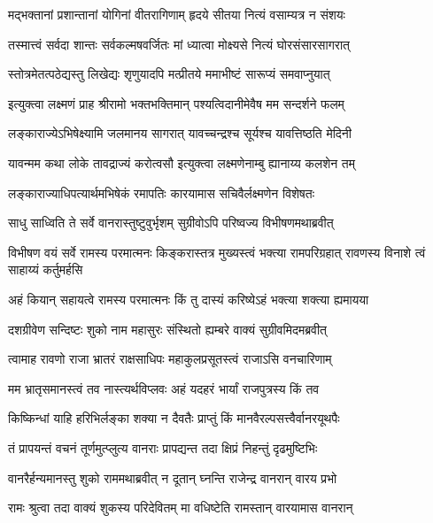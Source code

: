 \twolineshloka
{मद्भक्तानां प्रशान्तानां योगिनां वीतरागिणाम्}
{हृदये सीतया नित्यं वसाम्यत्र न संशयः} %

\twolineshloka
{तस्मात्त्वं सर्वदा शान्तः सर्वकल्मषवर्जितः}
{मां ध्यात्वा मोक्ष्यसे नित्यं घोरसंसारसागरात्} %

\twolineshloka
{स्तोत्रमेतत्पठेद्यस्तु लिखेद्यः शृणुयादपि}
{मत्प्रीतये ममाभीष्टं सारूप्यं समवाप्नुयात्} %

\twolineshloka
{इत्युक्त्वा लक्ष्मणं प्राह श्रीरामो भक्तभक्तिमान्}
{पश्यत्विदानीमेवैष मम सन्दर्शने फलम्} %

\twolineshloka
{लङ्काराज्येऽभिषेक्ष्यामि जलमानय सागरात्}
{यावच्चन्द्रश्च सूर्यश्च यावत्तिष्ठति मेदिनी} %

\twolineshloka
{यावन्मम कथा लोके तावद्राज्यं करोत्वसौ}
{इत्युक्त्वा लक्ष्मणेनाम्बु ह्यानाय्य कलशेन तम्} %

\twolineshloka
{लङ्काराज्याधिपत्यार्थमभिषेकं रमापतिः}
{कारयामास सचिवैर्लक्ष्मणेन विशेषतः} %

\twolineshloka
{साधु साध्विति ते सर्वे वानरास्तुष्टुवुर्भृशम्}
{सुग्रीवोऽपि परिष्वज्य विभीषणमथाब्रवीत्} %

\threelineshloka
{विभीषण वयं सर्वे रामस्य परमात्मनः}
{किङ्करास्तत्र मुख्यस्त्वं भक्त्या रामपरिग्रहात्}
{रावणस्य विनाशे त्वं साहाय्यं कर्तुमर्हसि} %


\twolineshloka
{अहं कियान् सहायत्वे रामस्य परमात्मनः}
{किं तु दास्यं करिष्येऽहं भक्त्या शक्त्या ह्यमायया} %

\twolineshloka
{दशग्रीवेण सन्दिष्टः शुको नाम महासुरः}
{संस्थितो ह्यम्बरे वाक्यं सुग्रीवमिदमब्रवीत्} %

\twolineshloka
{त्वामाह रावणो राजा भ्रातरं राक्षसाधिपः}
{महाकुलप्रसूतस्त्वं राजाऽसि वनचारिणाम्} %

\twolineshloka
{मम भ्रातृसमानस्त्वं तव नास्त्यर्थविप्लवः}
{अहं यदहरं भार्यां राजपुत्रस्य किं तव} %

\twolineshloka
{किष्किन्धां याहि हरिभिर्लङ्का शक्या न दैवतैः}
{प्राप्तुं किं मानवैरल्पसत्त्वैर्वानरयूथपैः} %

\twolineshloka
{तं प्रापयन्तं वचनं तूर्णमुत्प्लुत्य वानराः}
{प्रापद्यन्त तदा क्षिप्रं निहन्तुं दृढमुष्टिभिः} %

\twolineshloka
{वानरैर्हन्यमानस्तु शुको राममथाब्रवीत्}
{न दूतान् घ्नन्ति राजेन्द्र वानरान् वारय प्रभो} %

\twolineshloka
{रामः श्रुत्वा तदा वाक्यं शुकस्य परिदेवितम्}
{मा वधिष्टेति रामस्तान् वारयामास वानरान्} %

